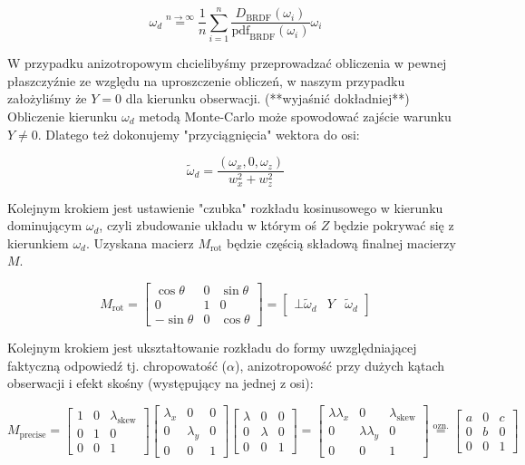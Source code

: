 \documentclass[../main.tex]{subfiles}
\begin{document}
$$
\omega_d
\stackrel{n \rightarrow \infty}{=}
\frac{1}{n} \sum_{i=1}^{n} {
  \frac{
    D_{\text{BRDF}}(\omega_i)
  }{
    \text{pdf}_{\text{BRDF}}(\omega_i)
  }
  \omega_i
}
$$

W przypadku anizotropowym chcielibyśmy przeprowadzać obliczenia w pewnej
płaszczyźnie ze względu na uproszczenie obliczeń, w naszym przypadku
założyliśmy że $Y=0$ dla kierunku obserwacji. (**wyjaśnić dokładniej**)
Obliczenie kierunku $\omega_d$ metodą Monte-Carlo może spowodować zajście
warunku $Y \neq 0$. Dlatego też dokonujemy "przyciągnięcia" wektora do
osi:

$$
\widetilde{\omega}_d = \frac{
    \left( \omega_x,0,\omega_z \right)
  }{
    w_x^2+w_z^2
  }
$$

Kolejnym krokiem jest ustawienie "czubka" rozkładu kosinusowego w kierunku
dominującym $\omega_d$, czyli zbudowanie układu w którym oś $Z$ będzie
pokrywać się z kierunkiem $\omega_d$. Uzyskana macierz $M_{\text{rot}}$
będzie częścią składową finalnej macierzy $M$.

$$
M_{\text{rot}} =
\begin{bmatrix}
  \cos\theta  & 0     & \sin\theta \\
  0           & 1     & 0 \\
  -\sin\theta & 0     & \cos\theta
\end{bmatrix}
= \begin{bmatrix}
  \bot {\widetilde{\omega}_d} & Y & \widetilde{\omega}_d
\end{bmatrix}
$$

Kolejnym krokiem jest ukształtowanie rozkładu do formy uwzględniającej
faktyczną odpowiedź tj. chropowatość ($\alpha$), anizotropowość przy
dużych kątach obserwacji i efekt skośny (występujący na jednej z osi):

$$
M_{\text{precise}} =
\begin{bmatrix}
  1 & 0 & \lambda_{\text{skew}} \\
  0 & 1 & 0 \\
  0 & 0 & 1
\end{bmatrix}
\begin{bmatrix}
  \lambda_x & 0 & 0 \\
  0 & \lambda_y & 0 \\
  0 & 0 & 1
\end{bmatrix}
\begin{bmatrix}
  \lambda & 0 & 0 \\
  0 & \lambda & 0 \\
  0 & 0 & 1
\end{bmatrix}
=
\begin{bmatrix}
  \lambda\lambda_x & 0 & \lambda_{\text{skew}} \\
  0 & \lambda\lambda_y & 0 \\
  0 & 0 & 1
\end{bmatrix}
\stackrel{\text{ozn.}}{=}
\begin{bmatrix}
  a & 0 & c \\
  0 & b & 0 \\
  0 & 0 & 1
\end{bmatrix}
$$
\end{document}

